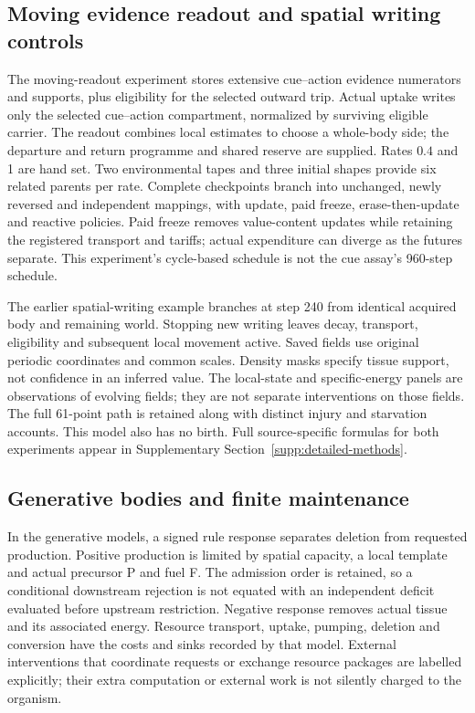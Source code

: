 \subsection*{Moving evidence readout and spatial writing controls}

The moving-readout experiment stores extensive cue--action evidence numerators and supports, plus eligibility for the selected outward trip. Actual uptake writes only the selected cue--action compartment, normalized by surviving eligible carrier. The readout combines local estimates to choose a whole-body side; the departure and return programme and shared reserve are supplied. Rates $0.4$ and 1 are hand set. Two environmental tapes and three initial shapes provide six related parents per rate. Complete checkpoints branch into unchanged, newly reversed and independent mappings, with update, paid freeze, erase-then-update and reactive policies. Paid freeze removes value-content updates while retaining the registered transport and tariffs; actual expenditure can diverge as the futures separate. This experiment's cycle-based schedule is not the cue assay's 960-step schedule.

The earlier spatial-writing example branches at step 240 from identical acquired body and remaining world. Stopping new writing leaves decay, transport, eligibility and subsequent local movement active. Saved fields use original periodic coordinates and common scales. Density masks specify tissue support, not confidence in an inferred value. The local-state and specific-energy panels are observations of evolving fields; they are not separate interventions on those fields. The full 61-point path is retained along with distinct injury and starvation accounts. This model also has no birth. Full source-specific formulas for both experiments appear in Supplementary Section~\ref{supp:detailed-methods}.

\subsection*{Generative bodies and finite maintenance}

In the generative models, a signed rule response separates deletion from requested production. Positive production is limited by spatial capacity, a local template and actual precursor P and fuel F. The admission order is retained, so a conditional downstream rejection is not equated with an independent deficit evaluated before upstream restriction. Negative response removes actual tissue and its associated energy. Resource transport, uptake, pumping, deletion and conversion have the costs and sinks recorded by that model. External interventions that coordinate requests or exchange resource packages are labelled explicitly; their extra computation or external work is not silently charged to the organism.

